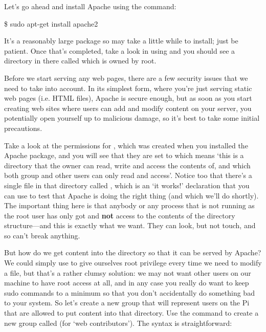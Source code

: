 Let's go ahead and install Apache using the command:

\begin{ttoutenv}
\$ sudo apt-get install apache2
\end{ttoutenv}

It's a reasonably large package so may take a little while to install; just be patient. Once that's completed, take a look in  using  and you should see a directory in there called  which is owned by root.

Before we start serving any web pages, there are a few security issues that we need to take into account. In its simplest form, where you're just serving static web pages (i.e. HTML files), Apache is secure enough, but as soon as you start creating web sites where users can add and modify content on your server, you potentially open yourself up to malicious damage, so it's best to take some initial precautions. 

Take a look at the permissions for , which was created when you installed the Apache package, and you will see that they are set to  which means `this is a directory that the owner can read, write and access the contents of, and which both group and other users can only read and access'. Notice too that there's a single file in that directory called , which is an `it works!' declaration that you can use to test that Apache is doing the right thing (and which we'll do shortly). The important thing here is that anybody or any process that is not running as the root user has only got  and \textbf{not}  access to the contents of the  directory structure---and this is exactly what we want. They can look, but not touch, and so can't break anything. 

But how do we get content into the  directory so that it can be served by Apache? We could simply use  to give ourselves root privilege every time we need to modify a file, but that's a rather clumsy solution: we may not want other users on our machine to have root access at all, and in any case you really do want to keep sudo commands to a minimum so that you don't accidentally do something bad to your system. So let's create a new group that will represent users on the Pi that are allowed to put content into that directory. Use the command  to create a new group called  (for `web contributors'). The syntax is straightforward:

